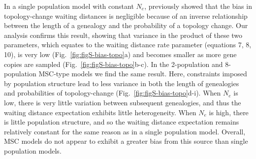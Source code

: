 \documentclass[11pt]{article}
\begin{document}
In a single population model with constant $N_e$, \citet{deng_distribution_2021}
previously showed that the bias in topology-change waiting distances is negligible
because of an inverse relationship between the length of a genealogy
and the probability of a topology change. Our analysis confirms this result,
showing that variance in the product of these two parameters, 
which equates to the waiting distance rate parameter (equations 7, 8, 10), 
is very low (Fig.~\ref{fig:figS-bias-topo}a) and becomes smaller as more 
gene copies are sampled (Fig.~\ref{fig:figS-bias-topo}b-c). In the 2-population
and 8-population MSC-type models we find the same result. Here, constraints 
imposed by population structure lead to less variance in both the 
length of genealogies and probabilities of topology-change
(Fig.~\ref{fig:figS-bias-topo}d-i). When $N_e$ is low, there is very 
little variation between subsequent genealogies, and thus the waiting 
distance expectation exhibits little heterogeneity. When $N_e$ is high,
there is little population structure, and so the waiting distance 
expectation remains relatively constant for the same reason as in a 
single population model. Overall, MSC models do not appear to exhibit a greater
bias from this source than single population models.
\end{document}
